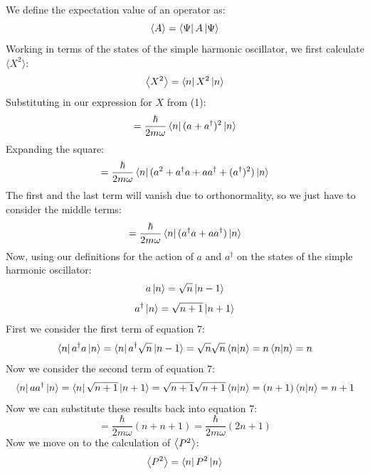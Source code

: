 \documentclass[12pt]{article}
\begin{document}
We define the expectation value of an operator as:
\begin{equation}
    \ev{A} = \bra{\Psi}A\ket{\Psi}
\end{equation}
Working in terms of the states of the simple harmonic oscillator, we first calculate \(\langle X^2\rangle\):
\begin{equation}
    \ev{X^2} = \bra{n}X^2\ket{n}
\end{equation}
Substituting in our expression for \(X\) from (1):
\begin{equation}
    = \frac{\hbar}{2m\omega}\bra{n}(a + a^{\dagger})^2\ket{n}
\end{equation}
Expanding the square:
\begin{equation}
    = \frac{\hbar}{2m\omega}\bra{n}(a^2 + a^{\dagger}a + aa^{\dagger} + (a^{\dagger})^2)\ket{n}
\end{equation}
The first and the last term will vanish due to orthonormality, so we just have to consider the middle terms:
\begin{equation}
    = \frac{\hbar}{2m\omega}\bra{n}(a^{\dagger}a + aa^{\dagger})\ket{n}
\end{equation}
Now, using our definitions for the action of \(a\) and \(a^{\dagger}\) on the states of the simple harmonic oscillator:
\begin{equation}
    a\ket{n} = \sqrt{n}\ket{n-1}
\end{equation}
\begin{equation}
    a^{\dagger}\ket{n} = \sqrt{n+1}\ket{n+1}
\end{equation}
First we consider the first term of equation 7:
\begin{equation}
\bra{n}a^{\dagger}a\ket{n} = \bra{n}a^{\dagger}\sqrt{n}\ket{n-1} = \sqrt{n}\sqrt{n}\bra{n}\ket{n}=n\bra{n}\ket{n}=n
\end{equation}
Now we consider the second term of equation 7:
\begin{equation}
\bra{n}aa^{\dagger}\ket{n} = \bra{n}\sqrt{n+1}\ket{n+1} = \sqrt{n+1}\sqrt{n+1}\bra{n}\ket{n}=(n+1)\bra{n}\ket{n}=n+1
\end{equation}
Now we can substitute these results back into equation 7:
\begin{equation}
    = \frac{\hbar}{2m\omega}(n + n + 1)\boxed{= \frac{\hbar}{2m\omega}(2n + 1)}
\end{equation}
Now we move on to the calculation of \(\ev{P^2}\):
\begin{equation}
    \ev{P^2} = \bra{n}P^2\ket{n}
\end{equation}
\end{document}
